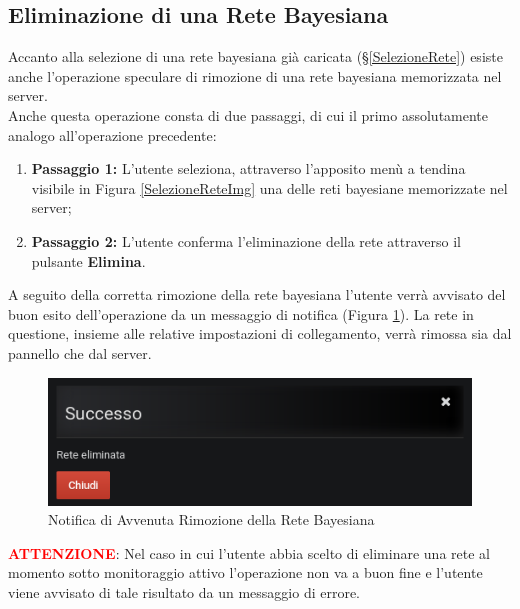 \subsection{Eliminazione di una Rete Bayesiana}\label{EliminazioneRete}

Accanto alla selezione di una rete bayesiana già caricata (§\ref{SelezioneRete}) esiste anche l'operazione speculare di rimozione di una rete bayesiana memorizzata nel server.\\
Anche questa operazione consta di due passaggi, di cui il primo assolutamente analogo all'operazione precedente:
\begin{enumerate}
	\item \textbf{Passaggio 1:} L'utente seleziona, attraverso l'apposito menù a tendina visibile in Figura \ref{SelezioneReteImg} una delle reti bayesiane memorizzate nel server;
	\item \textbf{Passaggio 2:} L'utente conferma l'eliminazione della rete attraverso il pulsante \textbf{Elimina}.
\end{enumerate}

A seguito della corretta rimozione della rete bayesiana l'utente verrà avvisato del buon esito dell'operazione da un messaggio di notifica (Figura \ref{NotificaRimozioneRete}). La rete in questione, insieme alle relative impostazioni di collegamento, verrà rimossa sia dal pannello che dal server.

\begin{figure}[H]
	\begin{center}
		\includegraphics[scale=0.6]{./images/NotificaRimozioneRete.png}
		 \caption{Notifica di Avvenuta Rimozione della Rete Bayesiana}	
		 \label{NotificaRimozioneRete}
	\end{center}
\end{figure}

\textbf{\textcolor{red}{ATTENZIONE}}: Nel caso in cui l'utente abbia scelto di eliminare una rete al momento sotto monitoraggio attivo l'operazione non va a buon fine e l'utente viene avvisato di tale risultato da un messaggio di errore.
